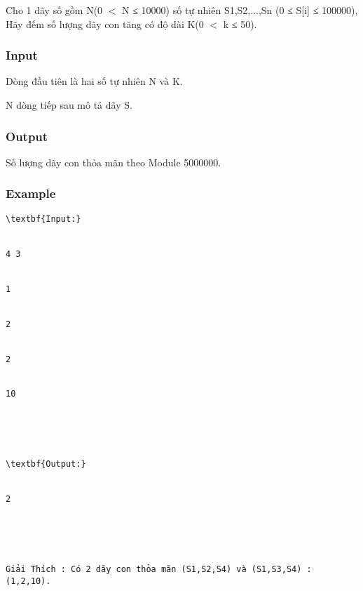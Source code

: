 



   Cho 1 dãy số gồm N(0 $<$ N ≤ 10000) số tự nhiên S1,S2,...,Sn (0 ≤ S[i] ≤ 100000), Hãy đếm số lượng dãy con tăng có độ dài K(0 $<$ k ≤ 50).  

\subsubsection{   Input  }

   Dòng đầu tiên là hai số tự nhiên N và K.  

   N dòng tiếp sau mô tả dãy S.  

\subsubsection{   Output  }

   Số lượng dãy con thỏa mãn theo Module 5000000.  

\subsubsection{   Example  }
\begin{verbatim}
\textbf{Input:}


4 3


1


2


2


10





\textbf{Output:}


2





Giải Thích : Có 2 dãy con thỏa mãn (S1,S2,S4) và (S1,S3,S4) : (1,2,10).\end{verbatim}
